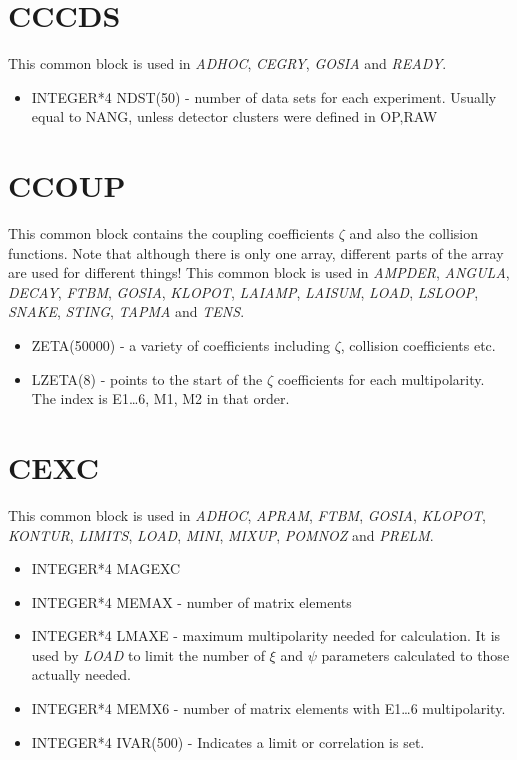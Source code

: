 \section{CCCDS}

This common block is used in {\em ADHOC}, {\em CEGRY}, {\em GOSIA} and {\em
READY}.

\begin{itemize}
\item INTEGER*4 NDST(50) - number of data sets for each experiment. Usually
equal to NANG, unless detector clusters were defined in OP,RAW
\end{itemize}

\section{CCOUP}

This common block contains the coupling coefficients $\zeta$ and also the
collision functions. Note that although there is only one array, different
parts of the array are used for different things! This common block is used
in {\em AMPDER}, {\em ANGULA}, {\em DECAY}, {\em FTBM}, {\em GOSIA}, {\em
KLOPOT}, {\em LAIAMP}, {\em LAISUM}, {\em LOAD}, {\em LSLOOP}, {\em SNAKE},
{\em STING}, {\em TAPMA} and {\em TENS}.

\begin{itemize}
\item ZETA(50000) - a variety of coefficients including $\zeta$, collision
coefficients etc.
\item LZETA(8) - points to the start of the $\zeta$ coefficients for each
multipolarity. The index is E1{\ldots}6, M1, M2 in that order.
\end{itemize}

\section{CEXC}

This common block is used in {\em ADHOC}, {\em APRAM}, {\em FTBM}, {\em
GOSIA}, {\em KLOPOT}, {\em KONTUR}, {\em LIMITS}, {\em LOAD}, {\em MINI},
{\em MIXUP}, {\em POMNOZ} and {\em PRELM}.

\begin{itemize}
\item INTEGER*4 MAGEXC
\item INTEGER*4 MEMAX - number of matrix elements
\item INTEGER*4 LMAXE - maximum multipolarity needed for calculation. It is
used by {\em LOAD} to limit the number of $\xi$ and $\psi$ parameters
calculated to those actually needed.
\item INTEGER*4 MEMX6 - number of matrix elements with E1{\ldots}6
multipolarity.
\item INTEGER*4 IVAR(500) - Indicates a limit or correlation is set.
\end{itemize}

